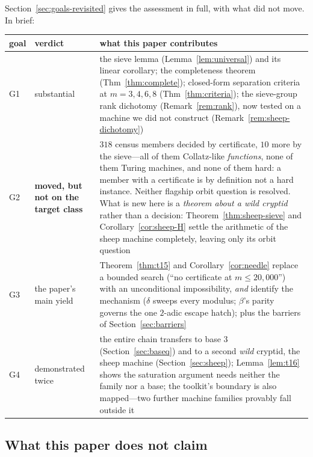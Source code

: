 \documentclass[11pt]{article}
\theoremstyle{definition}
\theoremstyle{remark}
\begin{document}
Section~\ref{sec:goals-revisited} gives the assessment in full, with what did
not move.  In brief:

\begin{center}
\small
\begin{tabular}{@{}llp{8.1cm}@{}}
\toprule
goal & verdict & what this paper contributes \\
\midrule
G1 & substantial &
  the sieve lemma (Lemma~\ref{lem:universal}) and its linear corollary; the
  completeness theorem (Thm~\ref{thm:complete}); closed-form separation
  criteria at $m=3,4,6,8$ (Thm~\ref{thm:criteria}); the sieve-group rank
  dichotomy (Remark~\ref{rem:rank}), now tested on a machine we did not
  construct (Remark~\ref{rem:sheep-dichotomy}) \\
G2 & \textbf{moved, but not on the target class} &
  $318$ census members decided by certificate, $10$ more by the sieve---all
  of them Collatz-like \emph{functions}, none of them Turing machines, and
  none of them hard: a member with a certificate is by definition not a hard
  instance.  Neither flagship orbit question is resolved.  What is new here is
  a \emph{theorem about a wild cryptid} rather than a decision:
  Theorem~\ref{thm:sheep-sieve} and Corollary~\ref{cor:sheep-H} settle the
  arithmetic of the sheep machine completely, leaving only its orbit question
  \\
G3 & the paper's main yield &
  Theorem~\ref{thm:t15} and Corollary~\ref{cor:needle} replace a bounded
  search (``no certificate at $m\le 20{,}000$'') with an unconditional
  impossibility, \emph{and} identify the mechanism ($\delta$ sweeps every
  modulus; $\beta$'s parity governs the one $2$-adic escape hatch); plus the
  barriers of Section~\ref{sec:barriers} \\
G4 & demonstrated twice &
  the entire chain transfers to base $3$ (Section~\ref{sec:baseq}) and to a
  second \emph{wild} cryptid, the sheep machine (Section~\ref{sec:sheep});
  Lemma~\ref{lem:t16} shows the saturation argument needs neither the family
  nor a base; the toolkit's boundary is also mapped---two further machine
  families provably fall outside it \\
\bottomrule
\end{tabular}
\end{center}

\subsection{What this paper does not claim}
\label{sec:notclaimed}
\end{document}
